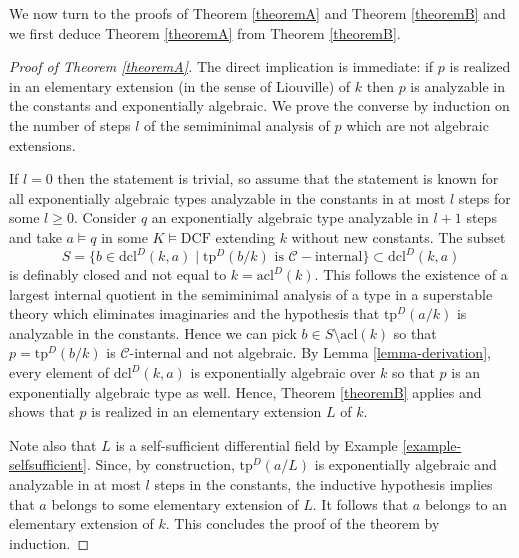 \documentclass[12pt]{amsart}
\newcommand{\DCF}{\mathrm{DCF}}
\theoremstyle{definition}
\theoremstyle{plain}
\theoremstyle{exampstyle}\newtheorem{thmx}{Theorem}
\theoremstyle{exampstyle}\newtheorem{thmxbis}{Theorem}
\begin{document}
We now turn to the proofs of Theorem \ref{theoremA} and Theorem \ref{theoremB} and we first deduce Theorem \ref{theoremA} from Theorem \ref{theoremB}.

\begin{proof}[Proof of Theorem \ref{theoremA}]
The direct implication is immediate: if $p$ is realized in an elementary extension (in the sense of Liouville) of $k$ then $p$ is analyzable in the constants and exponentially algebraic. We prove the converse by induction on the number of steps $l$ of the semiminimal analysis of $p$ which are not algebraic extensions.

If $l = 0$ then the statement is trivial, so assume that the statement is known for all exponentially algebraic types analyzable in the constants in at most $l$ steps for some $l \geq 0$. Consider $q$ an exponentially algebraic type analyzable in $l + 1$ steps and take $a \models q$ in some $K \models \DCF$ extending $k$ without new constants. The subset
$$ S = \lbrace  b \in \mathrm{dcl}^D(k,a) \mid \mathrm{tp}^D(b/k) \text{ is } \mathcal C-\text{internal} \rbrace \subset  \mathrm{dcl}^D(k,a)   $$
is definably closed and not equal to $k = \mathrm{acl}^D(k)$. This follows the existence of a largest internal quotient in the semiminimal analysis of a type in a superstable theory which eliminates imaginaries and the hypothesis that $\mathrm{tp}^D({a}/k)$ is analyzable in the constants. Hence we can pick $b \in S \setminus \mathrm{acl}(k)$ so that $p = \mathrm{tp}^{D}(b/k)$ is $\mathcal C$-internal and not algebraic. By Lemma \ref{lemma-derivation}, every element of $\mathrm{dcl}^D(k,a)$ is exponentially algebraic over $k$ so that $p$ is an exponentially algebraic type as well. Hence, Theorem \ref{theoremB} applies and shows that $p$ is realized in an elementary extension $L$ of $k$. 

Note also that $L$ is a self-sufficient differential field by Example \ref{example-selfsufficient}.  Since, by construction, $\mathrm{tp}^D(a/L)$ is exponentially algebraic and analyzable in at most $l$ steps in the constants, the inductive hypothesis implies that $a$ belongs to some elementary extension of $L$. It follows that $a$ belongs to an elementary extension of $k$. This concludes the proof of the theorem by induction. \end{proof}
\end{document}
